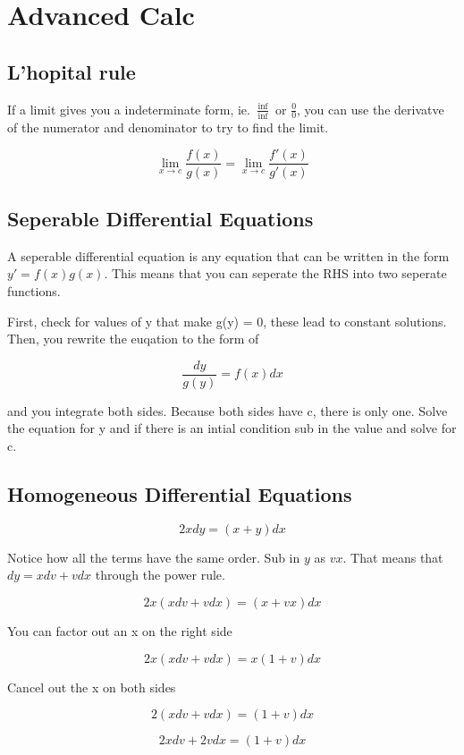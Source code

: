 \documentclass[../main.tex]{subfiles}
\begin{document}
\section{Advanced Calc}


\subsection{L'hopital rule}

If a limit gives you a indeterminate form, ie. $\frac{\inf}{\inf}$ or $\frac{0}{0}$, you can use the derivatve of the numerator and denominator to try to find the limit.

\[ \lim_{x \to c} \frac{f(x)}{g(x)} = \lim_{x \to c} \frac{f'(x)}{g'(x)} \]

\subsection{Seperable Differential Equations}

A seperable differential equation is any equation that can be written in the form $y' = f(x)g(x)$. This means that you can seperate the RHS into two seperate functions.

First, check for values of y that make g(y) = 0, these lead to constant solutions. Then, you rewrite the euqation to the form of


\[ \frac{dy}{g(y)} = f(x)dx \]

and you integrate both sides. Because both sides have c, there is only one. Solve the equation for y and if there is an intial condition sub in the value and solve for c.

\subsection{Homogeneous Differential Equations}

\[ 2x dy = (x+y)dx \]

Notice how all the terms have the same order. Sub in $y$ as $vx$. That means that $dy = xdv + vdx$ through the power rule.


\[ 2x(xdv + vdx) = (x+ vx)dx \]

You can factor out an x on the right side


\[ 2x(xdv + vdx) = x(1 + v)dx \]

Cancel out the x on both sides

\[ 2(xdv + vdx) = (1 + v)dx \]


\[ 2xdv + 2vdx = (1 + v)dx \]
\end{document}
